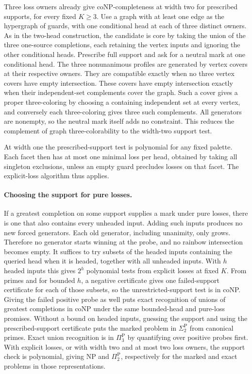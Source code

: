 Three loss owners already give coNP-completeness at width two
for prescribed supports, for every fixed $K\ge3$. Use a graph
with at least one edge as the hypergraph of guards, with one
conditional head at each of three distinct owners. As in the
two-head construction, the candidate is core by taking the
union of the three one-source completions, each retaining
the vertex inputs and ignoring the other conditional heads.
Prescribe full support and ask for a neutral mark at one
conditional head. The three nonunanimous profiles are generated
by vertex covers at their respective owners. They are compatible
exactly when no three vertex covers have empty intersection.
These covers have empty intersection exactly when their
independent-set complements cover the graph. Such a cover
gives a proper three-coloring by choosing a containing
independent set at every vertex, and conversely each
three-coloring gives three such complements.
All generators are nonempty, so the neutral mark itself
adds no constraint. This reduces the complement of graph
three-colorability to the width-two support test.

At width one the prescribed-support test is polynomial for
any fixed palette. Each facet then has at most one minimal
loss per head, obtained by taking all singleton exclusions,
unless an empty guard precludes losses on that facet.
The explicit-loss algorithm thus applies.

\paragraph{Choosing the support for pure losses.}
If a greatest completion on some support supplies a mark under
pure losses, there is one that also contains every unheaded input.
Adding such inputs produces no new forced generators. Each old
generator, including unanimity, only grows. Therefore no generator
starts winning at the probe, and no rainbow intersection becomes
empty. It suffices to try subsets of the headed inputs containing
the queried head when it is headed, together with all unheaded
inputs. With $h$ headed inputs this gives $2^h$ polynomial tests
from explicit losses at fixed $K$. From primes and for bounded
$h$, a negative certificate gives one failed-support certificate
for each of those subsets, so the unrestricted-support test is
in coNP. Giving the failed positive probe as well puts exact
recognition of unions of greatest completions in coNP under the
same bounded-head and pure-loss promises.
Without a bound on headed inputs, guessing the support and
using the prescribed-support certificate puts the marked
problem in $\Sigma_2^{\mathrm P}$ from canonical primes.
Exact union recognition is in $\Pi_3^{\mathrm P}$ by
quantifying over positive probes first. With explicit losses,
or with width two and at most two loss owners, the support
check is polynomial, giving NP and $\Pi_2^{\mathrm P}$,
respectively for the marked and exact problems in those
representations.

